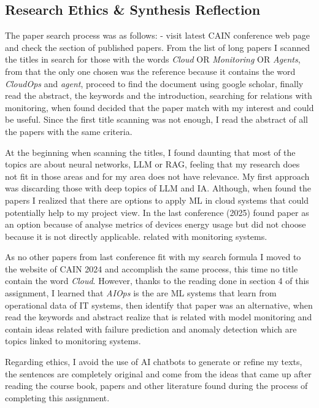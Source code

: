 \documentclass[11pt,a4paper]{article}
\begin{document}
 \subsection*{Research Ethics \& Synthesis Reflection}

The paper search process was as follows:
- visit latest CAIN conference web page and check the section of published papers. From the list of long papers I scanned the titles in search for those with the words \textit{Cloud} OR \textit{Monitoring} OR \textit{Agents}, from that the only one chosen was the reference \cite{11030040} because it contains the word \textit{CloudOps} and \textit{agent}, proceed to find the document using google scholar, finally read the abstract, the keywords and the introduction, searching for relations with monitoring, when found decided that the paper match with my interest and could be useful. Since the first title scanning was not enough, I read the abstract of all the papers with the same criteria. 

At the beginning when scanning the titles, I found daunting that most of the topics are about neural networks, LLM or RAG, feeling that my research does not fit in those areas and for my area does not have relevance. My first approach was discarding those with deep topics of LLM and IA. Although, when found the papers I realized that there are options to apply ML in cloud systems that could potentially help to my project view. In the last conference (2025) found paper \cite{11030023} as an option because of analyse metrics of devices energy usage but did not choose because it is not directly applicable. related with monitoring systems.

As no other papers from last conference fit with my search formula I moved to the website of CAIN 2024 and accomplish the same process, this time no title contain the word \textit{Cloud}. However, thanks to the reading done in section 4 of this assignment, I learned that \textit{AIOps} is the are ML systems that learn from operational data of IT systems, then identify that paper \cite{Poenaru-Olaru} was an alternative, when read the keywords and abstract realize that is related with model monitoring and contain ideas related with failure prediction and anomaly detection which are topics linked to monitoring systems.   

Regarding ethics, I avoid the use of AI chatbots to generate or refine my texts, the sentences are completely original and come from the ideas that came up after reading the course book, papers and other literature found during the process of completing this assignment. 



\end{document}
